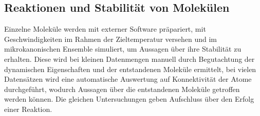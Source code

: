 \subsection{Reaktionen und Stabilität von Molekülen}

Einzelne Moleküle werden mit externer Software präpariert, mit Geschwindigkeiten im Rahmen der Zieltemperatur versehen und im mikrokanonischen Ensemble simuliert, um Aussagen über ihre Stabilität zu erhalten.
Diese wird bei kleinen Datenmengen manuell durch Begutachtung der dynamischen Eigenschaften und der entstandenen Moleküle ermittelt, bei vielen Datensätzen wird eine automatische Auswertung auf Konnektivität der Atome durchgeführt, wodurch Aussagen über die entstandenen Moleküle getroffen werden können.
Die gleichen Untersuchungen geben Aufschluss über den Erfolg einer Reaktion.
